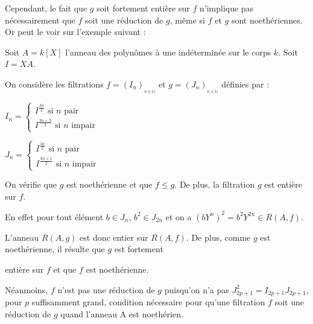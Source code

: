 \begin{maremarque}
	Cependant, le fait que $g$ soit fortement entière sur $f$ n'implique pas
	nécessairement que $f$ soit une réduction de $g$, m\^{e}me si $f$ et 
	$g$ sont noethériennes. Or peut le voir sur l'exemple suivant : 
	
	Soit $A=k[X]$ l'anneau des polynômes à une indéterminée sur le
	corps $k$. Soit $I=XA$. 
	
	On considère les filtrations $f=(I_{n})_{_{n\in \mathbb{N}}}$ et $g=(J_{n})_{_{n\in \mathbb{N}}}$ définies par
	:
	
	$I_{n}=\left\{ 
	\begin{array}{c}
		I^{\frac{3n}{2}}\text{ si }n\text{ pair} \\ 
		I^{\frac{3n+3}{2}}\text{ si }n\text{ impair}%
	\end{array}%
	\right. $
	
	$J_{n}=\left\{ 
	\begin{array}{c}
		I^{\frac{3n}{2}}\text{ si }n\text{ pair} \\ 
		I^{\frac{3n+1}{2}}\text{ si }n\text{ impair}
	\end{array}
	\right. $
	
	On vérifie que $g$ est noethérienne et que $f\leq g$. De plus, la
	filtration $g$ est entière sur $f$. 
	
	En effet pour tout élément $b\in J_{n}$, $b^{2}\in J_{2n}$ et on a $(bY^{n})^{2}=b^{2}Y^{2n}\in R(A,f)$. 
	
	L'anneau $R(A,g)$ est donc entier sur $R(A,f)$. De plus, comme $g$ est noethérienne, il résulte que $g$ est fortement
	
	entière sur $f$ et que $f$ est noethérienne. 
	
	Néanmoins, $f$ n'est pas une réduction de $g$ puisqu'on n'a pas $J_{2p+1}^{2}=I_{2p+1}J_{2p+1}$, pour $p$ suffisamment grand, condition nécessaire pour qu'une filtration $f$ soit une réduction de $g$ quand
	l'anneau A est noethérien. 
\end{maremarque}
